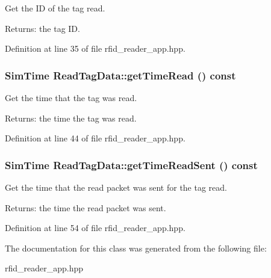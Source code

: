 Get the ID of the tag read. 

\begin{Desc}
\item[Returns:]the tag ID. \end{Desc}


Definition at line 35 of file rfid\_\-reader\_\-app.hpp.
\subsubsection{\setlength{\rightskip}{0pt plus 5cm}\bf{Sim\-Time} Read\-Tag\-Data::get\-Time\-Read () const\hspace{0.3cm}{\tt  [inline]}}\label{classReadTagData_ccec15f76f1bb34c5799cfe2bd47db4f}


Get the time that the tag was read. 

\begin{Desc}
\item[Returns:]the time the tag was read. \end{Desc}


Definition at line 44 of file rfid\_\-reader\_\-app.hpp.
\subsubsection{\setlength{\rightskip}{0pt plus 5cm}\bf{Sim\-Time} Read\-Tag\-Data::get\-Time\-Read\-Sent () const\hspace{0.3cm}{\tt  [inline]}}\label{classReadTagData_5e114c8da846057b30f50fe469a7afde}


Get the time that the read packet was sent for the tag read. 

\begin{Desc}
\item[Returns:]the time the read packet was sent. \end{Desc}


Definition at line 54 of file rfid\_\-reader\_\-app.hpp.

The documentation for this class was generated from the following file:\begin{CompactItemize}
\item 
rfid\_\-reader\_\-app.hpp\end{CompactItemize}
